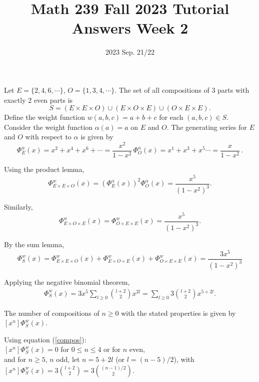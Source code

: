 \title{Math 239 Fall 2023 Tutorial Answers Week 2}

\date{2023 Sep. 21/22}
\maketitle

\begin{enumerate}
     Let 
        $E = \{2,4,6,\cdots\}$,  
        $O = \{1,3,4,\cdots\}$.  The set of all compositions of $3$ parts with exactly $2$ even parts is $$S= (E \times E \times O) \cup (E \times O \times E)  \cup  (O \times E \times E).$$   
    Define the weight function $w(a,b,c) = a+b+c$ for each $(a,b,c) \in S$. Consider the weight function $\alpha(a) = a$ on $E$ and $O$.  The generating series for $E$ and $O$ with respect to $\alpha$ is given by 
    $$\Phi^\alpha_E(x) = x^2 + x^4 + x^6 + \cdots =\frac{x^2}{1-x^2}\,\Phi^\alpha_O(x) = x^1 + x^3 + x^5\cdots =\frac{x}{1-x^2}\,.$$
    
    Using the product lemma, 
    $$\Phi^w_{E \times E \times O}(x) = (\Phi^\alpha_E(x))^2 \Phi^\alpha_O(x) = \frac{x^5}{(1-x^2)^3}.$$
    
    Similarly, $$\Phi^w_{E \times O \times E}(x) = \Phi^w_{O \times E \times E}(x)= \frac{x^5}{(1-x^2)^3}.$$ 
    
    By the sum lemma, $$\Phi^w_S(x) = \Phi^w_{E \times E \times O}(x) + \Phi^w_{E \times O \times E}(x) + \Phi^w_{O \times E \times E}(x) = \frac{3 x^5}{(1-x^2)^3}$$
    
    Applying the negative binomial theorem, 
    \begin{align} 
        \Phi^w_S(x) = 3 x^5 \sum_{l \geq 0} {l+2 \choose 2} x^{2l} = \sum_{l \geq 0} 3 {l+2 \choose 2}x^{5+2l}.
        \label{compos}
    \end{align}
    
    The number of compositions of $n \geq 0$ with the stated properties is given  by $[x^n]\Phi^w_S(x)$.  
    
    Using equation (\ref{compos}):\\$[x^n]\Phi^w_S(x) = 0$ for $0 \leq n \leq 4$ or for $n$ even, \\and for $n \geq 5$, $n$ odd, let $n=5+2l$ (or $l=(n-5)/2$), with $[x^n]\Phi^w_S(x) = 3 {l+2 \choose 2} = 3 {(n-1)/2 \choose 2}$.

    


\end{enumerate}
